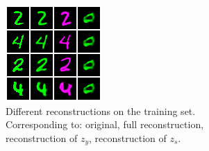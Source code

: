 \begin{figure}[tb]
  \centering
  \begin{subfigure}[b]{0.39\textwidth}
    \centering
    \includegraphics[width=\textwidth]{example_images/fresh-dawn-2179_train_reconstructions_9900.png}
    \caption{
    Different reconstructions on the training set.
    Corresponding to: original, full reconstruction, reconstruction of $z_y$, reconstruction of $z_s$.
    }%
    \label{fig:cmnist-recon-training}
  \end{subfigure}
  \quad
  \begin{subfigure}[b]{0.39\textwidth}
    \centering

\end{subfigure}
\end{figure}
